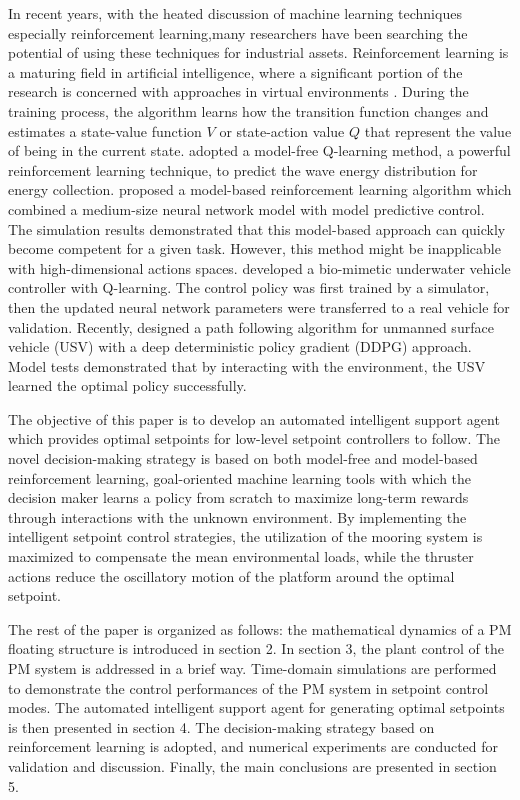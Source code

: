 \begin{sloppypar}
In recent years, with the heated discussion of machine learning techniques especially reinforcement learning,many researchers have been searching the potential of using these techniques for industrial assets. Reinforcement learning is a maturing field in artificial intelligence, where a significant portion of the research is concerned with approaches  in virtual environments \cite{sutton1999reinforcement}. During the training process, the algorithm learns how the transition function changes and estimates a state-value function $V$ or state-action value $Q$ that represent the value of being in the current state.\cite{anderlini2018reactive} adopted a model-free Q-learning method, a powerful reinforcement learning technique, to predict the wave energy distribution for energy collection.\cite{nagabandi2018neural} proposed a model-based reinforcement learning algorithm which combined a  medium-size neural network model with model predictive control. The simulation results demonstrated that this model-based approach can quickly become competent for a given task. However, this method might be inapplicable with high-dimensional actions spaces. \cite{magalhaes2018reinforcement} developed a bio-mimetic underwater vehicle controller with Q-learning. The control policy was first trained by a simulator, then the updated neural network parameters were transferred to a real vehicle for validation. Recently, \cite{woo2019deep} designed a path following algorithm for unmanned surface vehicle (USV) with a deep deterministic policy gradient (DDPG) approach. Model tests demonstrated that by interacting with the environment, the USV learned the optimal policy successfully.

The objective of this paper is to develop an automated intelligent support agent which provides optimal setpoints for low-level setpoint controllers to follow. The novel decision-making strategy is based on both model-free and model-based reinforcement learning, goal-oriented machine learning tools with which the decision maker learns a policy from scratch to maximize long-term rewards through interactions with the unknown environment. By implementing the intelligent setpoint control strategies, the utilization of the mooring system is maximized to compensate the mean environmental loads, while the thruster actions reduce the oscillatory motion of the platform around the optimal setpoint.

The rest of the paper is organized as follows: the mathematical dynamics of a PM floating structure is introduced in section 2. In section 3, the plant control of the PM system is addressed in a brief way. Time-domain simulations are performed to demonstrate the control performances of the PM system in setpoint control modes. The automated intelligent support agent for generating optimal setpoints is then presented in section 4. The decision-making strategy based on reinforcement learning is adopted, and numerical experiments are conducted for validation and discussion. Finally, the main conclusions are presented in section 5.


\end{sloppypar}
